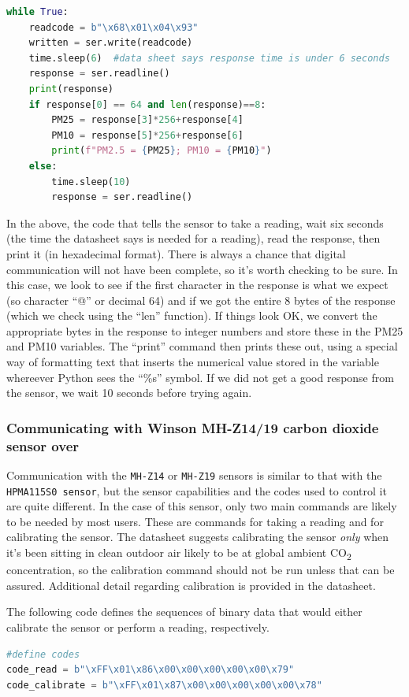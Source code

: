 \begin{lstlisting}[language=Python]
while True:
	readcode = b"\x68\x01\x04\x93"
	written = ser.write(readcode) 
	time.sleep(6)  #data sheet says response time is under 6 seconds
	response = ser.readline()
	print(response)
	if response[0] == 64 and len(response)==8:
		PM25 = response[3]*256+response[4]
		PM10 = response[5]*256+response[6]
		print(f"PM2.5 = {PM25}; PM10 = {PM10}")
	else:
		time.sleep(10)
		response = ser.readline()

\end{lstlisting}

In the above, the code that tells the sensor to take a reading, wait six seconds (the time the datasheet says is needed for a reading), read the response, then print it (in hexadecimal format).
There is always a chance that digital communication will not have been complete, so it's worth checking to be sure.
In this case, we look to see if the first character in the response is what we expect (so character “@” or decimal 64) and if we got the entire 8 bytes of the response (which we check using the “len” function).
If things look OK, we convert the appropriate bytes in the response to integer numbers and store these in the PM25 and PM10 variables.
The “print” command then prints these out, using a special way of formatting text that inserts the numerical value stored in the variable whereever Python sees the “\%s” symbol.
If we did not get a good response from the sensor, we wait 10 seconds before trying again.

\subsubsection{Communicating with Winson MH-Z14/19 carbon dioxide sensor over \uart}

Communication with the \texttt{MH-Z14} or \texttt{MH-Z19} sensors is similar to that with the \texttt{HPMA115S0 sensor}, but the sensor capabilities and the codes used to control it are quite different.
In the case of this sensor, only two main commands are likely to be needed by most users.
These are commands for taking a reading and for calibrating the sensor.
The datasheet suggests calibrating the sensor \emph{only} when it's been sitting in clean outdoor air likely to be at global ambient CO\textsubscript{2} concentration, so the calibration command should not be run unless that can be assured.
Additional detail regarding calibration is provided in the datasheet.

The following code defines the sequences of binary data that would either calibrate the sensor or perform a reading, respectively.
\begin{lstlisting}[language=Python]
#define codes
code_read = b"\xFF\x01\x86\x00\x00\x00\x00\x00\x79"
code_calibrate = b"\xFF\x01\x87\x00\x00\x00\x00\x00\x78"
\end{lstlisting}

